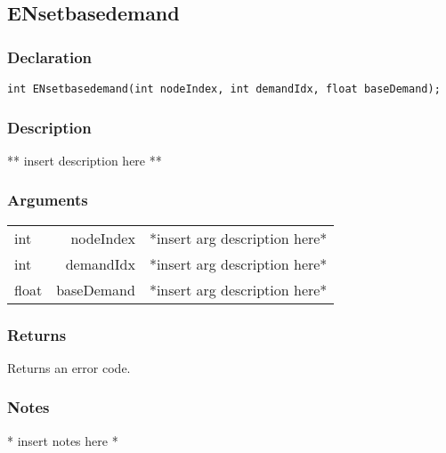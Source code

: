 \subsection{ENsetbasedemand}
\subsubsection{Declaration}
\begin{lstlisting}
int ENsetbasedemand(int nodeIndex, int demandIdx, float baseDemand);
\end{lstlisting}
\subsubsection{Description}
** insert description here **
\subsubsection{Arguments}
\begin{tabular}{l r p{11cm} }
int&nodeIndex&*insert arg description here* \\[6pt]
int&demandIdx&*insert arg description here* \\[6pt]
float&baseDemand&*insert arg description here* \\[6pt]
\end{tabular}
\subsubsection{Returns}
Returns an error code.
\subsubsection{Notes}
* insert notes here *